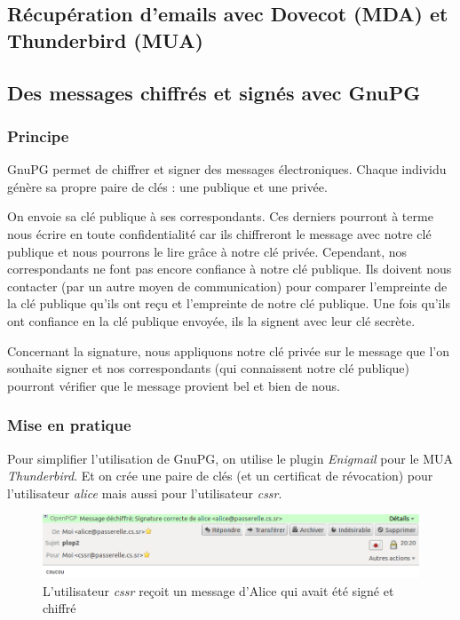 \documentclass[a4paper]{article}
\begin{document}
\subsection{Récupération d'emails avec Dovecot (MDA) et Thunderbird (MUA)}

\subsection{Des messages chiffrés et signés avec GnuPG}

\subsubsection{Principe}

GnuPG permet de chiffrer et signer des messages électroniques. 
Chaque individu génère sa propre paire de clés : une publique et une privée.

On envoie sa clé publique à ses correspondants. Ces derniers pourront à 
terme nous écrire en toute confidentialité car ils chiffreront le message 
avec notre clé publique et nous
pourrons le lire grâce à notre clé privée.
Cependant, nos correspondants ne font pas encore confiance à notre clé publique. 
Ils doivent nous contacter (par un autre moyen de 
communication) pour comparer l'empreinte de la clé publique qu'ils ont reçu et l'empreinte
de notre clé publique. Une fois qu'ils ont confiance en la clé publique envoyée,
ils la signent avec leur clé secrète. 


Concernant la signature, nous appliquons notre clé privée sur le message que l'on souhaite
signer et nos correspondants (qui connaissent notre clé publique) pourront
vérifier que le message provient bel et bien de nous.

\subsubsection{Mise en pratique}

Pour simplifier l'utilisation de GnuPG, on utilise le plugin \textit{Enigmail} pour le MUA
\textit{Thunderbird}. Et on crée une paire de clés (et un certificat de révocation)
pour l'utilisateur \textit{alice} mais aussi pour l'utilisateur \textit{cssr}.

\begin{figure}[!ht]
	\centering
	\includegraphics[scale=.5]{pgp.png}
	\caption{\label{pgp} L'utilisateur \textit{cssr} reçoit un message d'Alice qui avait été signé et chiffré}
\end{figure}
\end{document}
